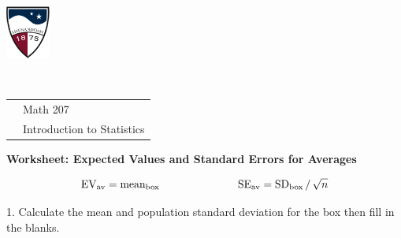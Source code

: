 \documentclass[10pt]{article}
\begin{document}
\pagestyle{empty}
\lstset{language=R, showspaces=false, showstringspaces=false}

\href{http://www.su.edu}{\includegraphics[height=1.75cm]{sulogo.eps}}
\vspace{-1.79cm}

{{\ }\hfill\small
\begin{tabular}{cl}
& Math 207\\
& Introduction to Statistics\\
\end{tabular}
}
\setlength{\baselineskip}{1.05\baselineskip}

\medskip

\begin{center}
\textbf{\large  Worksheet:  Expected Values and Standard Errors for Averages}
\end{center}\vspace{-15pt}

\[\mbox{EV}_{\mbox{\scriptsize av}} = \mbox{mean}_{\mbox{\scriptsize box}}\hspace{1in}
  \mbox{SE}_{\mbox{\scriptsize av}} = \mbox{SD}_{\mbox{\scriptsize box}} \,/\, \sqrt{n}\]

\newcommand{\HH}{\hspace{20pt}\hphantom{a) } }
%
\newcommand{\twobox}[2]{\begin{pspicture}(-0.3,0.2)(2,1.3)
\psframe(0,0)(0.7,0.7)\rput(0.35,0.35){#1}
\psframe(1,0)(1.7,0.7)\rput(1.35,0.35){#2}
\psline(-0.3,0.9)(-0.3,-0.2)(2,-0.2)(2,0.9)(-0.3,0.9)
\end{pspicture}}
%
\newcommand{\threebox}[3]{\begin{pspicture}(0.2,0.2)(2.5,1.3)
\psframe(0,0)(0.7,0.7)\rput(0.35,0.35){#1}
\psframe(1,0)(1.7,0.7)\rput(1.35,0.35){#2}
\psframe(2,0)(2.7,0.7)\rput(2.35,0.35){#3}
\psline(-0.3,0.9)(-0.3,-0.2)(3,-0.2)(3,0.9)(-0.3,0.9)
\end{pspicture}}


1. Calculate the mean and population standard deviation for the box then fill in the blanks. \vspace{-5pt}
\end{document}
